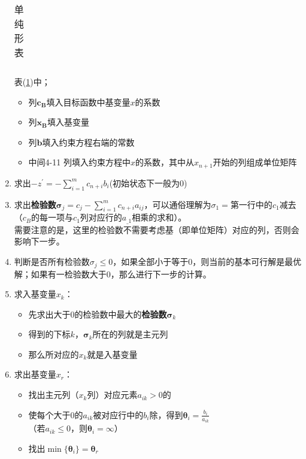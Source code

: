 \documentclass{book}
\begin{document}
\begin{enumerate}
\begin{table}[ht]
\begin{tabular}{c|c|c|cccccccc|c}
                  \hline
              \end{tabular}
              \caption{单纯形表}
              \label{tab:label de SM}
          \end{table}
          表(\ref{tab:label de SM})中；
          \begin{itemize}
              \item 列$\boldsymbol{c_B}$填入目标函数中基变量$x$的系数
              \item 列$\boldsymbol{x_B}$填入基变量
              \item 列$\boldsymbol{b}$填入约束方程右端的常数
              \item 中间4-11 列填入约束方程中$x$的系数，其中从$x_{n+1}$开始的列组成单位矩阵
          \end{itemize}
    \item 求出$-z^{\prime}=-\sum\limits_{i=1}^mc_{n+i}b_i$(初始状态下一般为0)
    \item 求出\textbf{检验数}$\boldsymbol{\sigma}_j=c_j-\sum\limits_{i=1}^mc_{n+i}a_{ij}$，可以通俗理解为$\sigma_1=$第一行中的$c_1$减去（$c_B$的每一项与$c_1$列对应行的$a_{\_1}$相乘的求和）。\\
          需要注意的是，这里的检验数不需要考虑基（即单位矩阵）对应的列，否则会影响下一步。
    \item 判断是否所有检验数$\sigma_j\le0$，如果全部小于等于0，则当前的基本可行解是最优解；如果有一检验数大于0，那么进行下一步的计算。
    \item 求入基变量$x_k$：
          \begin{itemize}
              \item 先求出大于0的检验数中最大的\textbf{检验数}$\boldsymbol{\sigma}_k$
              \item 得到的下标$k$，$\boldsymbol{\sigma}_k$所在的列就是主元列
              \item 那么所对应的$x_k$就是入基变量
          \end{itemize}
    \item 求出基变量$x_r$：
          \begin{itemize}
              \item 找出主元列（$x_k$列）对应元素$a_{ik}>0$的
              \item 使每个大于0的$a_{ik}$被对应行中的$b_i$除，得到$\boldsymbol{\theta}_i=\frac{b_i}{a_{ik}}$\\
                    （若$a_{ik}\le0$，则$\boldsymbol{\theta}_i=\infty$）
              \item 找出$\min\{\boldsymbol{\theta}_i\}=\boldsymbol{\theta}_r$

\end{itemize}
\end{enumerate}
\end{document}
